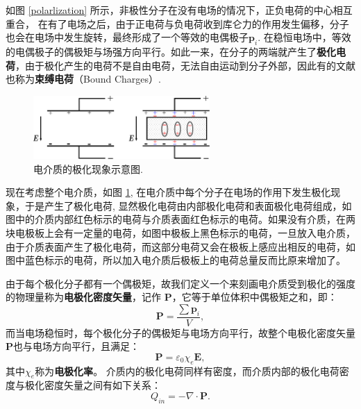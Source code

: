 \documentclass[10pt,reqno, final]{ctexart}
\begin{document}
如图 \ref{polarlization} 所示，非极性分子在没有电场的情况下，正负电荷的中心相互重合， 在有了电场之后，由于正电荷与负电荷收到库仑力的作用发生偏移，分子也会在电场中发生旋转，最终形成了一个等效的电偶极子$\bm{p}_i$. 在稳恒电场中，等效的电偶极子的偶极矩与场强方向平行。如此一来，在分子的两端就产生了\textbf{极化电荷}，由于极化产生的电荷不是自由电荷，无法自由运动到分子外部，因此有的文献也称为\textbf{束缚电荷}（Bound Charges）.
\begin{figure}[htp]
	\centering
	\includegraphics[width=0.6\textwidth]{Figures/jihuashiyan}
	\caption {电介质的极化现象示意图. }
	\label{jihuashiyan}
\end{figure}

现在考虑整个电介质，如图 \ref{jihuashiyan}, 在电介质中每个分子在电场的作用下发生极化现象，于是产生了极化电荷, 显然极化电荷由内部极化电荷和表面极化电荷组成，如图中的介质内部红色标示的电荷与介质表面红色标示的电荷。如果没有介质，在两块电极板上会有一定量的电荷，如图中极板上黑色标示的电荷，一旦放入电介质，由于介质表面产生了极化电荷，而这部分电荷又会在极板上感应出相反的电荷，如图中蓝色标示的电荷，所以加入电介质后极板上的电荷总量反而比原来增加了。

由于每个极化分子都有一个偶极矩，故我们定义一个来刻画电介质受到极化的强度的物理量称为\textbf{电极化密度矢量}，记作 $\bm{P}$，它等于单位体积中偶极矩之和，即：
\begin{equation}
\bm{P} = \frac{\sum {\bm{p}_i}}{V}, 
\end{equation}
而当电场稳恒时，每个极化分子的偶极矩与电场方向平行，故整个电极化密度矢量$\bm{P}$也与电场方向平行，且满足：
\begin{equation}\label{P=kappaE}
\bm{P} = \varepsilon_0\chi_e \bm{E}, 
\end{equation}
其中$\chi_e$称为\textbf{电极化率}。
介质内的极化电荷同样有密度，而介质内部的极化电荷密度与极化密度矢量之间有如下关系：
\begin{equation}\label{innercontribute}
{Q}_{in} = -\nabla \cdot \bm{P}.
\end{equation}
\end{document}
